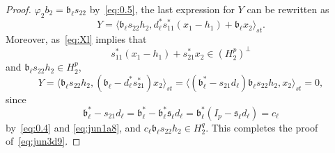 \documentclass[12pt,twoside,a4paper]{amsart}
\theoremstyle{definition}
\numberwithin{equation}{section}
\begin{document}
\begin{proof}
$\varphi_2b_2= {{\mathfrak b}}_\ell
s_{22}$ by~\eqref{eq:0.5}, the last expression for $Y$
can be rewritten as
\[
Y=\langle {{\mathfrak b}}_\ell s_{22}h_2, d_\ell^* s_{11}^*(x_1-h_1)+{{\mathfrak b}}_\ell x_2
\rangle_{st}.
\]
Moreover, as~\eqref{eq:Xl} implies that
\[
s_{11}^*(x_1-h_1)+s_{21}^*x_2\in \left(H_2^p\right)^\perp
\]
and  ${{\mathfrak b}}_\ell s_{22}h_2\in H_2^p$,
\[
Y=\langle {{\mathfrak b}}_\ell s_{22}h_2, ({{\mathfrak b}}_\ell-d_\ell^* s_{21}^*) x_2
\rangle_{st}
=\langle ({{\mathfrak b}}_\ell^*-s_{21}d_\ell){{\mathfrak b}}_\ell s_{22}h_2, x_2
\rangle_{st} =0,
\]
since
\[
{{\mathfrak b}}_\ell^*-s_{21}d_\ell={{\mathfrak b}}_\ell^*-{{\mathfrak b}}_\ell^*{{\mathfrak s}}_\ell
d_\ell={{\mathfrak b}}_\ell^*(I_p-{{\mathfrak s}}_\ell d_\ell)=c_\ell
\]
by~\eqref{eq:0.4} and \eqref{eq:jun1a8}, and
$c_\ell{{\mathfrak b}}_\ell s_{22}h_2\in H_2^q$. This completes the proof
of~\eqref{eq:jun3d9}.


\end{proof}
\end{document}
